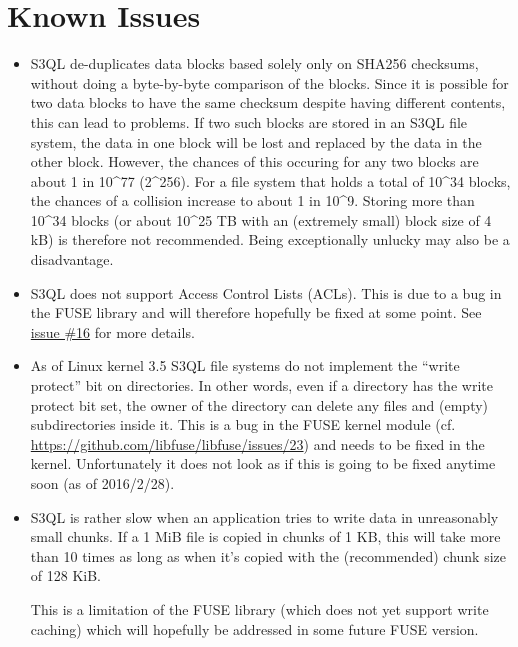 \documentclass[letterpaper,10pt,english]{sphinxmanual}
\begin{document}
\chapter{Known Issues}
\label{issues::doc}\label{issues:known-issues}\begin{itemize}
\item {} 
S3QL de-duplicates data blocks based solely only on SHA256
checksums, without doing a byte-by-byte comparison of the blocks.
Since it is possible for two data blocks to have the same checksum
despite having different contents, this can lead to problems. If two
such blocks are stored in an S3QL file system, the data in one block
will be lost and replaced by the data in the other block. However,
the chances of this occuring for any two blocks are about 1 in 10\textasciicircum{}77
(2\textasciicircum{}256). For a file system that holds a total of 10\textasciicircum{}34 blocks, the
chances of a collision increase to about 1 in 10\textasciicircum{}9. Storing more
than 10\textasciicircum{}34 blocks (or about 10\textasciicircum{}25 TB with an (extremely small) block
size of 4 kB) is therefore not recommended. Being exceptionally
unlucky may also be a disadvantage.

\item {} 
S3QL does not support Access Control Lists (ACLs). This is due to a
bug in the FUSE library and will therefore hopefully be fixed at
some point. See \href{https://bitbucket.org/nikratio/s3ql/issue/16/support-access-control-lists-acls}{issue \#16}
for more details.

\item {} 
As of Linux kernel 3.5 S3QL file systems do not implement the ``write
protect'' bit on directories. In other words, even if a directory has
the write protect bit set, the owner of the directory can delete any
files and (empty) subdirectories inside it. This is a bug in the
FUSE kernel module
(cf. \href{https://github.com/libfuse/libfuse/issues/23}{https://github.com/libfuse/libfuse/issues/23}) and needs to be
fixed in the kernel.  Unfortunately it does not look as if this is
going to be fixed anytime soon (as of 2016/2/28).

\item {} 
S3QL is rather slow when an application tries to write data in
unreasonably small chunks. If a 1 MiB file is copied in chunks of 1
KB, this will take more than 10 times as long as when it's copied
with the (recommended) chunk size of 128 KiB.

This is a limitation of the FUSE library (which does not yet support
write caching) which will hopefully be addressed in some future FUSE
version.


\end{itemize}
\end{document}
